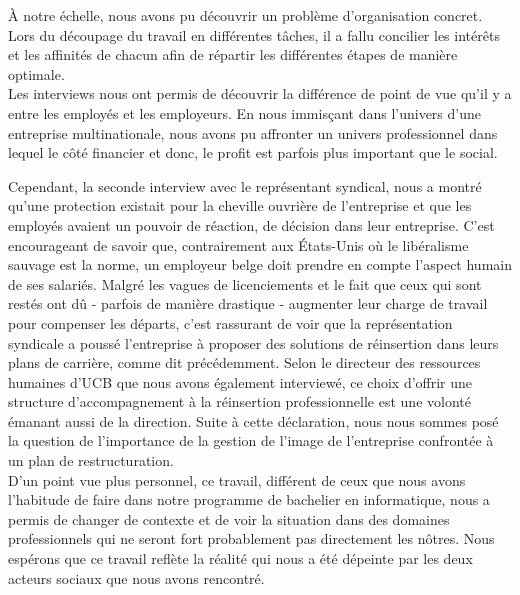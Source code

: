 À notre échelle, nous avons pu découvrir un problème d’organisation concret. Lors du découpage du travail en différentes tâches, il a fallu concilier les intérêts et les affinités de chacun afin de répartir les différentes étapes de manière optimale.\\

Les interviews nous ont permis de découvrir la différence de point de vue qu’il y a entre les employés et les employeurs. En nous immisçant dans l’univers d’une entreprise multinationale, nous avons pu affronter un univers professionnel dans lequel le côté financier et donc, le profit est parfois plus important que le social.

Cependant, la seconde interview avec le représentant syndical, nous a montré qu’une protection existait pour la cheville ouvrière de l’entreprise et que les employés avaient un pouvoir de réaction, de décision dans leur entreprise. C’est encourageant de savoir que, contrairement aux États-Unis où le libéralisme sauvage est la norme, un employeur belge doit prendre en compte l’aspect humain de ses salariés. Malgré les vagues de licenciements et le fait que ceux qui sont restés ont dû - parfois de manière drastique - augmenter leur charge de travail pour compenser les départs, c’est rassurant de voir que la représentation syndicale a poussé l’entreprise à proposer des solutions de réinsertion dans leurs plans de carrière, comme dit précédemment. Selon le directeur des ressources humaines d’UCB que nous avons également interviewé, ce choix d’offrir une structure d’accompagnement à la réinsertion professionnelle est une volonté émanant aussi de la direction. Suite à cette déclaration, nous nous sommes posé la question de l’importance de la gestion de l’image de l’entreprise confrontée à un plan de restructuration.\\

D’un point vue plus personnel, ce travail, différent de ceux que nous avons l’habitude de faire dans notre programme de bachelier en informatique, nous a permis de changer de contexte et de voir la situation dans des domaines professionnels qui ne seront fort probablement pas directement les nôtres. Nous espérons que ce travail reflète la réalité qui nous a été dépeinte par les deux acteurs sociaux que nous avons rencontré.
